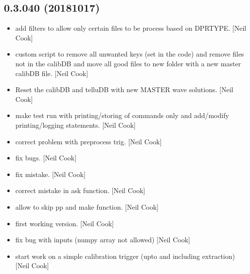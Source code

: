 \documentclass[a4paper,10pt,english]{report}
\begin{document}
\subsection{0.3.040 (2018\sphinxhyphen{}10\sphinxhyphen{}17)}
\label{\detokenize{misc/changelog:id308}}\begin{itemize}
\item {} 
 \sphinxhyphen{} add filters to allow only certain files to be
process based on DPRTYPE. {[}Neil Cook{]}

\item {} 
 \sphinxhyphen{} custom script to remove all unwanted keys (set in the
code) and remove files not in the calibDB and move all good files to
new folder with a new master calibDB file. {[}Neil Cook{]}

\item {} 
Reset the calibDB and telluDB with new MASTER wave solutions. {[}Neil
Cook{]}

\item {} 
 \sphinxhyphen{} make test run \sphinxhyphen{} with printing/storing of commands
only and add/modify printing/logging statements. {[}Neil Cook{]}

\item {} 
 \sphinxhyphen{} correct problem with preprocess trig. {[}Neil Cook{]}

\item {} 
 \sphinxhyphen{} fix bugs. {[}Neil Cook{]}

\item {} 
 \sphinxhyphen{} fix mistake. {[}Neil Cook{]}

\item {} 
 \sphinxhyphen{} correct mistake in ask function. {[}Neil Cook{]}

\item {} 
 \sphinxhyphen{} allow to skip pp and make function. {[}Neil Cook{]}

\item {} 
 \sphinxhyphen{} first working version. {[}Neil Cook{]}

\item {} 
 \sphinxhyphen{} fix bug with inputs (numpy array not allowed) {[}Neil
Cook{]}

\item {} 
 \sphinxhyphen{} start work on a simple calibration trigger (upto
and including extraction) {[}Neil Cook{]}

\end{itemize}
\end{document}
